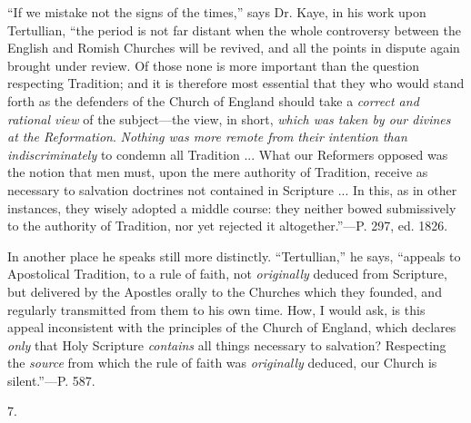 ``If we mistake not the signs of the times,'' says
Dr. Kaye, in his work upon Tertullian, ``the period is not far
distant when the whole controversy between the English and Romish
Churches will be revived, and all the points in dispute again brought
under review. Of those none is more important than the question
respecting Tradition; and it is therefore most essential that they who
would stand forth as the defenders of the Church of England should
take a \emph{correct and rational view} of the subject—the view, in
short, \emph{which was taken by our divines at the Reformation}. \emph{Nothing
was more remote from their intention than indiscriminately} to
condemn all Tradition ... What our Reformers opposed was the notion
that men must, upon the mere authority of Tradition, receive as
necessary to salvation doctrines not contained in Scripture ... In
this, as in other instances, they wisely adopted a middle course: they
neither bowed submissively to the authority of Tradition, nor yet
rejected it altogether.''—P. 297, ed. 1826.

In another place he speaks still more distinctly.
``Tertullian,'' he says, ``appeals to Apostolical Tradition, to a rule of
faith, not \emph{originally} deduced from Scripture, but delivered by
the Apostles orally to the Churches which they founded, and regularly
transmitted from them to his own time. How, I would ask, is this
appeal inconsistent with the principles of the Church of England,
which declares \emph{only} that Holy Scripture \emph{contains} all things
necessary to salvation? Respecting the \emph{source} from which the
rule of faith was \emph{originally} deduced, our Church is silent.''—P.
587.

7.

